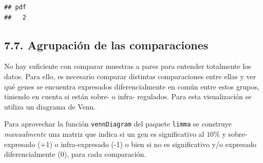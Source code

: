 \documentclass[
]{article}
\begin{document}
\begin{verbatim}
## pdf 
##   2
\end{verbatim}

\hypertarget{agrupaciuxf3n-de-las-comparaciones}{%
\subsection{7.7. Agrupación de las
comparaciones}\label{agrupaciuxf3n-de-las-comparaciones}}

No hay suficiente con comparar muestras a pares para entender totalmente
los datos. Para ello, es necesario comparar distintas comparaciones
entre ellas y ver qué genes se encuentra expresados diferencialmente en
común entre estos grupos, tiniendo en cuenta si están sobre- o infra-
regulados. Para esta visualización se utiliza un diagrama de Venn.

Para aprovechar la función \texttt{vennDiagram} del paquete
\texttt{limma} se construye \emph{manualmente} una matriz que indica si
un gen es significativo al \(10\%\) y sobre-expresado (+1) o
infra-expresado (-1) o bien si no es significativo y/o expresado
diferencialmente (0), para cada comparación.
\end{document}
